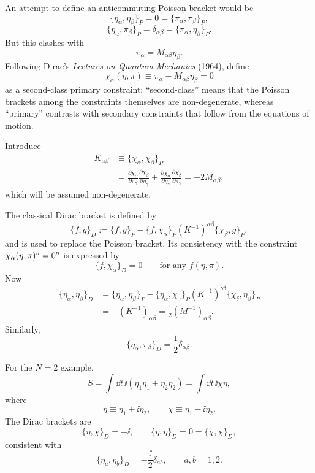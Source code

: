 An attempt to define an anticommuting Poisson bracket would be
\[
  \{\eta_\alpha,\eta_\beta\}_P=0=\{\pi_\alpha,\pi_\beta\}_P,
\]
\[
  \{\eta_\alpha,\pi_\beta\}_P
  =
  \delta_{\alpha\beta}
  =
  \{\pi_\alpha,\eta_\beta\}_P.
\]
But this clashes with
\[
  \pi_\alpha=M_{\alpha\beta}\eta_\beta.
\]
Following Dirac's \emph{Lectures on Quantum Mechanics} (1964), define
\[
  \chi_\alpha(\eta,\pi)
  \equiv
  \pi_\alpha-M_{\alpha\beta}\eta_\beta=0
\]
as a second-class primary constraint: ``second-class'' means that the
Poisson brackets among the constraints themselves are non-degenerate,
whereas ``primary'' contrasts with secondary constraints that follow from
the equations of motion.

Introduce
\[
\begin{aligned}
  K_{\alpha\beta}
  &\equiv
  \{\chi_\alpha,\chi_\beta\}_P
  \\
  &=
  \frac{\partial\chi_\alpha}{\partial\pi_\gamma}
  \frac{\partial\chi_\beta}{\partial\eta_\gamma}
  +
  \frac{\partial\chi_\alpha}{\partial\eta_\gamma}
  \frac{\partial\chi_\beta}{\partial\pi_\gamma}
  =
  -2M_{\alpha\beta},
\end{aligned}
\]
which will be assumed non-degenerate.

The classical Dirac bracket is defined by
\[
  \{f,g\}_D
  :=
  \{f,g\}_P
  -
  \{f,\chi_\alpha\}_P
  (K^{-1})^{\alpha\beta}
  \{\chi_\beta,g\}_P,
\]
and is used to replace the Poisson bracket.  Its consistency with the
constraint \(\chi_\alpha(\eta,\pi)``=0''\) is expressed by
\[
  \{f,\chi_\alpha\}_D=0
  \qquad
  \text{for any } f(\eta,\pi).
\]
Now
\[
\begin{aligned}
  \{\eta_\alpha,\eta_\beta\}_D
  &=
  \{\eta_\alpha,\eta_\beta\}_P
  -
  \{\eta_\alpha,\chi_\gamma\}_P
  (K^{-1})^{\gamma\delta}
  \{\chi_\delta,\eta_\beta\}_P
  \\
  &=
  -(K^{-1})_{\alpha\beta}
  =
  \frac12(M^{-1})_{\alpha\beta}.
\end{aligned}
\]
Similarly,
\[
  \{\eta_\alpha,\pi_\beta\}_D=\frac12\delta_{\alpha\beta}.
\]

For the \(N=2\) example,
\[
  S
  =
  \int\dd t\,\ii(\eta_1\dot\eta_1+\eta_2\dot\eta_2)
  =
  \int\dd t\,\ii\chi\dot\eta,
\]
where
\[
  \eta\equiv\eta_1+\ii\eta_2,
  \qquad
  \chi\equiv\eta_1-\ii\eta_2.
\]
The Dirac brackets are
\[
  \{\eta,\chi\}_D=-\ii,
  \qquad
  \{\eta,\eta\}_D=0=\{\chi,\chi\}_D,
\]
consistent with
\[
  \{\eta_a,\eta_b\}_D=-\frac{\ii}{2}\delta_{ab},
  \qquad a,b=1,2.
\]

